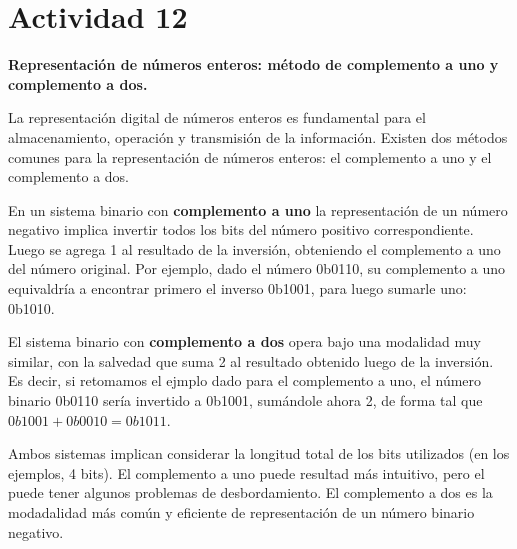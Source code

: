\section*{Actividad 12}
\textbf{Representación de números enteros: método de complemento a uno y complemento a dos.}

La representación digital de números enteros es fundamental para el almacenamiento, operación y transmisión de la información. Existen dos métodos comunes para la representación de números enteros: el complemento a uno y el complemento a dos. 

En un sistema binario con \textbf{complemento a uno} la representación de un número negativo implica invertir todos los bits del número positivo correspondiente. Luego se agrega 1 al resultado de la inversión, obteniendo el complemento a uno del número original. Por ejemplo, dado el número 0b0110, su complemento a uno equivaldría a encontrar primero el inverso 0b1001, para luego sumarle uno: 0b1010.

El sistema binario con \textbf{complemento a dos} opera bajo una modalidad muy similar, con la salvedad que suma 2 al resultado obtenido luego de la inversión. Es decir, si retomamos el ejmplo dado para el complemento a uno, el número binario 0b0110 sería invertido a 0b1001, sumándole ahora 2, de forma tal que $0b1001 + 0b0010 = 0b1011$. 

Ambos sistemas implican considerar la longitud total de los bits utilizados (en los ejemplos, 4 bits). El complemento a uno puede resultad más intuitivo, pero el puede tener algunos problemas de desbordamiento. El complemento a dos es la modadalidad más común y eficiente de representación de un número binario negativo. 
